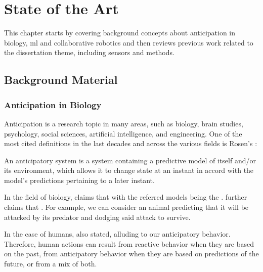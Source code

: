 \chapter{State of the Art}
\label{chapter:state_of_the_art}

This chapter starts by covering background concepts about anticipation in biology, \acl{ml} and collaborative robotics and then reviews previous work related to the dissertation theme, including sensors and methods.

\section{Background Material}

\subsection{Anticipation in Biology}

Anticipation is a research topic in many areas, such as biology, brain studies, psychology, social sciences, artificial intelligence, and engineering. One of the most cited definitions in the last decades and across the various fields is Rosen's \cite{Rosen1985}:

\begin{displayquote}
An anticipatory system is a system containing a predictive model of itself and/or its environment, which allows it to change state at an instant in accord with the model's predictions pertaining to a later instant.
\end{displayquote}

In the field of biology, \textcite{Louie2010} claims that  with the referred models being the . \textcite{Poli2010} further claims that . For example, we can consider an animal predicting that it will be attacked by its predator and dodging said attack to survive.

In the case of humans, \textcite{ Louie2010} also stated,  alluding to our anticipatory behavior. Therefore, human actions can result from reactive behavior when they are based on the past, from anticipatory behavior when they are based on predictions of the future, or from a mix of both.

